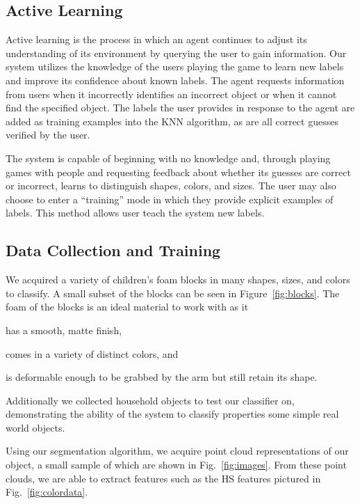 \documentclass[11pt]{article}
\begin{document}
\subsection{Active Learning}
Active learning is the process in which an agent continues to adjust its
understanding of its environment by querying the user to gain information.
Our system utilizes the knowledge of the users playing the game
to learn new labels and improve its confidence about known labels. The agent
requests information from users when it incorrectly identifies an
incorrect object or when it cannot find the specified object. The labels the
user provides in response to the agent are added as training examples into the
KNN algorithm, as are all correct guesses verified by the user.

The system is capable of beginning with no knowledge and, through playing games
with people and requesting feedback about whether its guesses are correct or
incorrect, learns to distinguish shapes, colors, and sizes. The
user may also choose to enter a ``training'' mode in which they provide
explicit examples of labels. This method allows user teach the system new labels.


\subsection{Data Collection and Training}
We acquired a variety of children's foam blocks in many shapes, sizes,
and colors to classify. A small subset of the
blocks can be seen in Figure~\ref{fig:blocks}. The foam of the blocks is an
ideal material to work with as it
\begin{inparaenum}[(1)]
\item has a smooth, matte finish,
\item comes in a variety of distinct colors, and
\item is deformable enough to be grabbed by the arm but still retain its
shape.
\end{inparaenum}
Additionally we collected household objects to test our classifier on,
demonstrating the ability of the system to classify properties some simple
real world objects.

Using our segmentation algorithm, we acquire point cloud representations of
our object, a small sample of which are shown in Fig.~\ref{fig:images}. From
these point clouds, we are able to extract features such as the HS features
pictured in Fig.~\ref{fig:colordata}.
\end{document}
